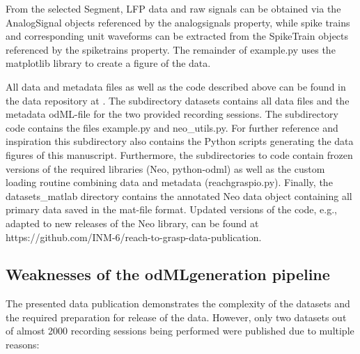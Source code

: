 {From the selected Segment, LFP data and raw signals can be obtained via the AnalogSignal objects referenced by the analogsignals property, while spike trains and corresponding unit waveforms can be extracted from the SpikeTrain objects referenced by the spiketrains property. The remainder of example.py uses the matplotlib library to create a figure of the data.

All data and metadata files as well as the code described above can be found in the data repository at . The subdirectory datasets contains all data files and the metadata odML-file for the two provided recording sessions. The subdirectory code contains the files example.py and neo\_utils.py. For further reference and inspiration this subdirectory also contains the Python scripts generating the data figures of this manuscript. Furthermore, the subdirectories to code contain frozen versions of the required libraries (Neo, python-odml) as well as the custom loading routine combining data and metadata (reachgraspio.py). Finally, the datasets\_matlab directory contains the annotated Neo data object containing all primary data saved in the mat-file format. Updated versions of the code, e.g., adapted to new releases of the Neo library, can be found at https://github.com/INM-6/reach-to-grasp-data-publication.
}

\subsection{Weaknesses of the odMLgeneration pipeline}
\label{sec:scidata_weaknesses}
The presented data publication demonstrates the complexity of the datasets and the required preparation for release of the data. However, only two datasets out of almost 2000 recording sessions being performed were published due to multiple reasons:

